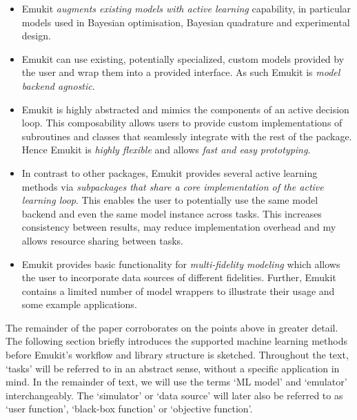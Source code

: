 \begin{itemize}
\item Emukit \emph{augments existing models with active learning} capability, in particular models used in Bayesian optimisation, Bayesian quadrature and experimental design.
\item Emukit can use existing, potentially specialized, custom models provided by the user and wrap them into a provided interface. As such Emukit is \emph{model backend agnostic}.
\item Emukit is highly abstracted and mimics the components of an active decision loop. This composability allows users to provide custom implementations of subroutines and classes that seamlessly integrate with the rest of the package. Hence Emukit is \emph{highly flexible} and allows \emph{fast and easy prototyping}.
\item In contrast to other packages, Emukit provides several active learning methods via \emph{subpackages that share a core implementation of the active learning loop}. This enables the user to potentially use the same model backend and even the same model instance across tasks. This increases consistency between results, may reduce implementation overhead and my allows resource sharing between tasks.
\item Emukit provides basic functionality for \emph{multi-fidelity modeling} which allows the user to incorporate data sources of different fidelities. Further, Emukit contains a limited number of model wrappers to illustrate their usage and some example applications.
\end{itemize}

The remainder of the paper corroborates on the points above in greater detail. The following section briefly introduces the supported machine learning methods before Emukit's workflow and library structure is sketched.
Throughout the text, `tasks' will be referred to in an abstract sense, without a specific application in mind.
In the remainder of text, we will use the terms `ML model' and `emulator' interchangeably. The `simulator' or `data source' will later also be referred to as `user function', `black-box function' or `objective function'.

